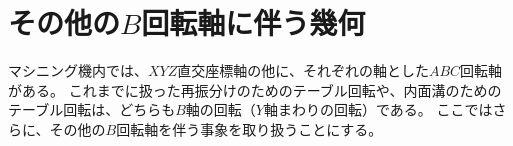 \chapter[その他の$B$回転軸に伴う幾何]
        {その他の$B$回転軸に伴う幾何}
マシニング機内では、$XYZ$直交座標軸の他に、それぞれの軸とした$ABC$回転軸がある。
これまでに扱った再振分けのためのテーブル回転や、内面溝のためのテーブル回転は、どちらも$B$軸の回転（$Y$軸まわりの回転）である。
ここではさらに、その他の$B$回転軸を伴う事象を取り扱うことにする。



